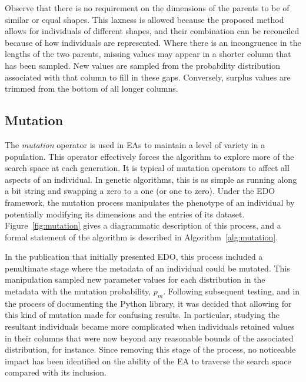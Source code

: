 
Observe that there is no requirement on the dimensions of the parents to be of
similar or equal shapes. This laxness is allowed because the proposed method
allows for individuals of different shapes, and their combination can be
reconciled because of how individuals are represented. Where there is an
incongruence in the lengths of the two parents, missing values may appear in a
shorter column that has been sampled. New values are sampled from the
probability distribution associated with that column to fill in these gaps.
Conversely, surplus values are trimmed from the bottom of all longer columns.



\subsection{Mutation}\label{subsection:mutation}

The \emph{mutation} operator is used in EAs to maintain a level of variety in a
population. This operator effectively forces the algorithm to explore more of
the search space at each generation. It is typical of mutation operators to
affect all aspects of an individual. In genetic algorithms, this is as simple as
running along a bit string and swapping a zero to a one (or one to zero). Under
the EDO framework, the mutation process manipulates the phenotype of an
individual by potentially modifying its dimensions and the entries of its
dataset. Figure~\ref{fig:mutation} gives a diagrammatic description of this
process, and a formal statement of the algorithm is described in
Algorithm~\ref{alg:mutation}.

In the publication that initially presented EDO, this process included a
penultimate stage where the metadata of an individual could be mutated. This
manipulation sampled new parameter values for each distribution in the metadata
with the mutation probability, \(p_m\). Following subsequent testing, and in the
process of documenting the Python library, it was decided that allowing for this
kind of mutation made for confusing results. In particular, studying the
resultant individuals became more complicated when individuals retained values
in their columns that were now beyond any reasonable bounds of the associated
distribution, for instance. Since removing this stage of the process, no
noticeable impact has been identified on the ability of the EA to traverse the
search space compared with its inclusion.

